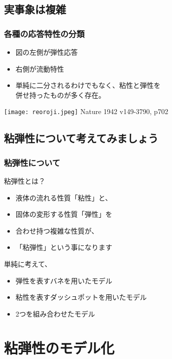 \documentclass[12pt, dvipdfmx]{beamer}
\begin{document}
\subsection{実事象は複雑}
\begin{frame}
	\frametitle{各種の応答特性の分類}
		\begin{itemize}
			\item 図の左側が弾性応答
			\item 右側が流動特性
			\item 単純に二分されるわけでもなく、\alert{粘性と弾性を\\併せ持ったもの}が多く存在。
		\end{itemize}
			\texttt{[image: reoroji.jpeg]}
			Nature 1942 v149-3790, p702
\end{frame}

\subsection{粘弾性について考えてみましょう}
\begin{frame}
	\frametitle{粘弾性について}
		\begin{block}{粘弾性とは？}
			\begin{itemize}
				\item 液体の流れる性質「粘性」と、
				\item 固体の変形する性質「弾性」を
				\item 合わせ持つ複雑な性質が、
				\item 「粘弾性」という事になります
			\end{itemize}
		\end{block}
		\begin{exampleblock}{単純に考えて、}
			\begin{itemize}
				\item 弾性を表すバネを用いたモデル
				\item 粘性を表すダッシュポットを用いたモデル
				\item 2つを組み合わせたモデル
			\end{itemize}
		\end{exampleblock}
\end{frame}


\section{粘弾性のモデル化}
\end{document}
